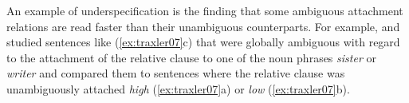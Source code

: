 \documentclass{cambridge7A}\usepackage[]{graphicx}\usepackage[]{color}
\begin{document}






An example of underspecification is the finding that some ambiguous attachment relations are read faster than their unambiguous counterparts. 
For example, \cite{TraxlerPickeringClifton1998} and \cite{Traxler2007} studied sentences like (\ref{ex:traxler07}c) that were globally ambiguous with regard to the attachment of the relative clause to one of the noun phrases \textit{sister} or \textit{writer} and compared them to sentences where the relative clause was unambiguously attached \emph{high} (\ref{ex:traxler07}a) or \emph{low} (\ref{ex:traxler07}b).
\end{document}
